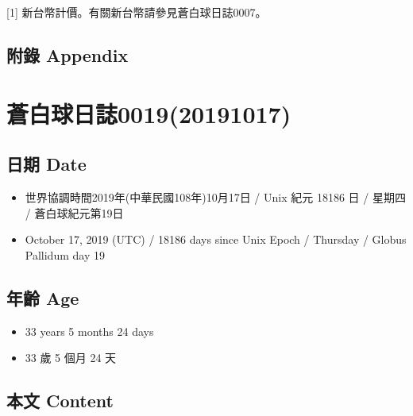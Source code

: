 \documentclass[a5paper, 12pt
]{book}
\providecommand{\tightlist}{%
  \setlength{\itemsep}{0pt}\setlength{\parskip}{0pt}}
\begin{document}
{[}1{]} 新台幣計價。有關新台幣請參見蒼白球日誌0007。

\hypertarget{ux9644ux9304-appendix-10}{%
\subsection{附錄 Appendix}\label{ux9644ux9304-appendix-10}}

\hypertarget{ux84bcux767dux7403ux65e5ux8a8c001920191017}{%
\section{蒼白球日誌0019(20191017)}\label{ux84bcux767dux7403ux65e5ux8a8c001920191017}}

\hypertarget{ux65e5ux671f-date-18}{%
\subsection{日期 Date}\label{ux65e5ux671f-date-18}}

\begin{itemize}
\tightlist
\item
  世界協調時間2019年(中華民國108年)10月17日 / Unix 紀元 18186 日 /
  星期四 / 蒼白球紀元第19日
\item
  October 17, 2019 (UTC) / 18186 days since Unix Epoch / Thursday /
  Globus Pallidum day 19
\end{itemize}

\hypertarget{ux5e74ux9f61-age-18}{%
\subsection{年齡 Age}\label{ux5e74ux9f61-age-18}}

\begin{itemize}
\tightlist
\item
  33 years 5 months 24 days
\item
  33 歲 5 個月 24 天
\end{itemize}

\hypertarget{ux672cux6587-content-18}{%
\subsection{本文 Content}\label{ux672cux6587-content-18}}
\end{document}
